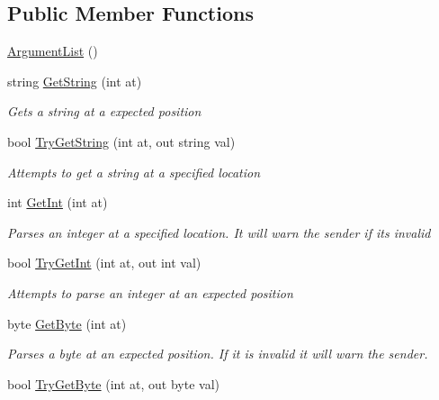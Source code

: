 \subsection*{Public Member Functions}
\begin{DoxyCompactItemize}
\item 
\hyperlink{class_o_t_a_1_1_command_1_1_argument_list_a3af2e2d7b1fd7b2159dd8c69c83bc4a7}{Argument\+List} ()
\item 
string \hyperlink{class_o_t_a_1_1_command_1_1_argument_list_abf1c56c7d65b7b6d98166fc55700df71}{Get\+String} (int at)
\begin{DoxyCompactList}\small\item\em Gets a string at a expected position \end{DoxyCompactList}\item 
bool \hyperlink{class_o_t_a_1_1_command_1_1_argument_list_a7da4fa3dbd90c315fc3345474def83a1}{Try\+Get\+String} (int at, out string val)
\begin{DoxyCompactList}\small\item\em Attempts to get a string at a specified location \end{DoxyCompactList}\item 
int \hyperlink{class_o_t_a_1_1_command_1_1_argument_list_a7a58c8a80f47db2dbb58d7cf905cba0d}{Get\+Int} (int at)
\begin{DoxyCompactList}\small\item\em Parses an integer at a specified location. It will warn the sender if it\textquotesingle{}s invalid \end{DoxyCompactList}\item 
bool \hyperlink{class_o_t_a_1_1_command_1_1_argument_list_a9fafd39fd6e6fe4bf287e290421de0bd}{Try\+Get\+Int} (int at, out int val)
\begin{DoxyCompactList}\small\item\em Attempts to parse an integer at an expected position \end{DoxyCompactList}\item 
byte \hyperlink{class_o_t_a_1_1_command_1_1_argument_list_ac4a059186caf86190d69d53740ce7361}{Get\+Byte} (int at)
\begin{DoxyCompactList}\small\item\em Parses a byte at an expected position. If it is invalid it will warn the sender. \end{DoxyCompactList}\item 
bool \hyperlink{class_o_t_a_1_1_command_1_1_argument_list_a71f31ce78f719679c2a2876b90c7cf01}{Try\+Get\+Byte} (int at, out byte val)

\end{DoxyCompactItemize}
